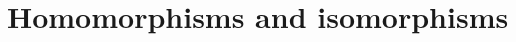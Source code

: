 \documentclass[11pt,a4paper]{article}
\begin{document}
\def\contador{Lesson 5}


\section{Homomorphisms and isomorphisms}
\end{document}
